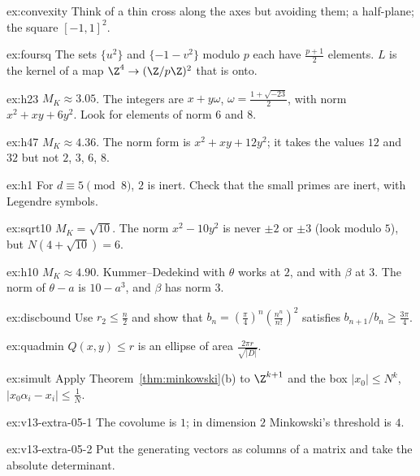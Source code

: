 \begin{hint}{ex:convexity}
Think of a thin cross along the axes but avoiding them; a half-plane; the square $[-1,1]^2$.
\end{hint}
\begin{hint}{ex:foursq}
The sets $\{u^2\}$ and $\{-1-v^2\}$ modulo $p$ each have $\frac{p+1}2$ elements. $L$ is the kernel of a map
$\Z^4\to(\Z/p\Z)^2$ that is onto.
\end{hint}
\begin{hint}{ex:h23}
$M_K\approx3.05$. The integers are $x+y\omega$, $\omega=\frac{1+\sqrt{-23}}2$, with norm $x^2+xy+6y^2$. Look for elements
of norm $6$ and $8$.
\end{hint}
\begin{hint}{ex:h47}
$M_K\approx4.36$. The norm form is $x^2+xy+12y^2$; it takes the values $12$ and $32$ but not $2$, $3$, $6$, $8$.
\end{hint}
\begin{hint}{ex:h1}
For $d\equiv5\pmod8$, $2$ is inert. Check that the small primes are inert, with Legendre symbols.
\end{hint}
\begin{hint}{ex:sqrt10}
$M_K=\sqrt{10}$. The norm $x^2-10y^2$ is never $\pm2$ or $\pm3$ (look modulo $5$), but $N(4+\sqrt{10})=6$.
\end{hint}
\begin{hint}{ex:h10}
$M_K\approx4.90$. Kummer--Dedekind with $\theta$ works at $2$, and with $\beta$ at $3$. The norm of $\theta-a$ is
$10-a^3$, and $\beta$ has norm $3$.
\end{hint}
\begin{hint}{ex:discbound}
Use $r_2\le\frac n2$ and show that $b_n=(\frac\pi4)^n(\frac{n^n}{n!})^2$ satisfies $b_{n+1}/b_n\ge\frac{3\pi}4$.
\end{hint}
\begin{hint}{ex:quadmin}
$Q(x,y)\le r$ is an ellipse of area $\frac{2\pi r}{\sqrt{|D|}}$.
\end{hint}
\begin{hint}{ex:simult}
Apply Theorem~\ref{thm:minkowski}(b) to $\Z^{k+1}$ and the box $|x_0|\le N^k$, $|x_0\alpha_i-x_i|\le\frac1N$.
\end{hint}

\begin{hint}{ex:v13-extra-05-1}
The covolume is $1$; in dimension $2$ Minkowski's threshold is $4$.
\end{hint}

\begin{hint}{ex:v13-extra-05-2}
Put the generating vectors as columns of a matrix and take the absolute determinant.
\end{hint}

